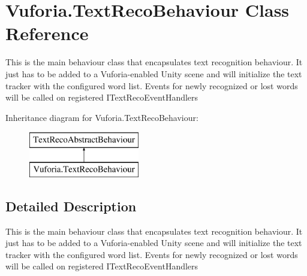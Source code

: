 \hypertarget{class_vuforia_1_1_text_reco_behaviour}{}\section{Vuforia.\+Text\+Reco\+Behaviour Class Reference}
\label{class_vuforia_1_1_text_reco_behaviour}


This is the main behaviour class that encapsulates text recognition behaviour. It just has to be added to a Vuforia-\/enabled Unity scene and will initialize the text tracker with the configured word list. Events for newly recognized or lost words will be called on registered I\+Text\+Reco\+Event\+Handlers  


Inheritance diagram for Vuforia.\+Text\+Reco\+Behaviour\+:\begin{figure}[H]
\begin{center}
\leavevmode
\includegraphics[height=2.000000cm]{class_vuforia_1_1_text_reco_behaviour}
\end{center}
\end{figure}


\subsection{Detailed Description}
This is the main behaviour class that encapsulates text recognition behaviour. It just has to be added to a Vuforia-\/enabled Unity scene and will initialize the text tracker with the configured word list. Events for newly recognized or lost words will be called on registered I\+Text\+Reco\+Event\+Handlers 

